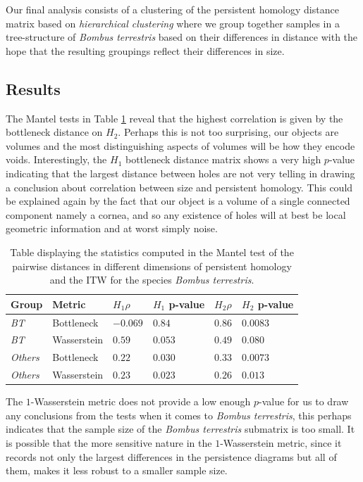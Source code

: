 Our final analysis consists of a clustering of the persistent homology distance matrix based on \textit{hierarchical clustering} where we group together samples in a tree-structure of \textit{Bombus terrestris} based on their differences in distance with the hope that the resulting groupings reflect their differences in size.

\subsection{Results}
The Mantel tests in Table \ref{mantelc} reveal that the highest correlation is given by the bottleneck distance on $H_{2}$. Perhaps this is not too surprising, our objects are volumes and the most distinguishing aspects of volumes will be how they encode voids. Interestingly, the $H_{1}$ bottleneck distance matrix shows a very high $p$-value indicating that the largest distance between holes are not very telling in drawing a conclusion about correlation between size and persistent homology. This could be explained again by the fact that our object is a volume of a single connected component namely a cornea, and so any existence of holes will at best be local geometric information and at worst simply noise.

\begin{table}[h]
\begin{center}

\begin{tabular}{*6l}    \toprule
Group  & Metric  & $H_{1} \rho $  & $H_{1}$ p-value  & $H_{2} \rho$ & $H_{2}$ p-value  \\ \midrule
\textit{BT} & Bottleneck & $-0.069$ & $0.84$ & $0.86$ & $0.0083$\\
\textit{BT} & Wasserstein & $0.59 $ & $0.053 $ & $0.49$ & $0.080$\\
\textit{Others}& Bottleneck & $0.22$ & $0.030$ & $0.33$ & $0.0073$\\
\textit{Others}& Wasserstein & $0.23$ & $0.023$ & $0.26$ & $0.013$\\\bottomrule
 \hline
\end{tabular}
\end{center}

\caption{\label{mantelc} Table displaying the statistics computed in the Mantel test of the pairwise distances in different dimensions of persistent homology and the ITW for the species \textit{Bombus terrestris}.}
\end{table}

The $1$-Wasserstein metric does not provide a low enough $p$-value for us to draw any conclusions from the tests when it comes to \textit{Bombus terrestris}, this perhaps indicates that the sample size of the \textit{Bombus terrestris} submatrix is too small. It is possible that the more sensitive nature in the $1$-Wasserstein metric, since it records not only the largest differences in the persistence diagrams but all of them, makes it less robust to a smaller sample size.


